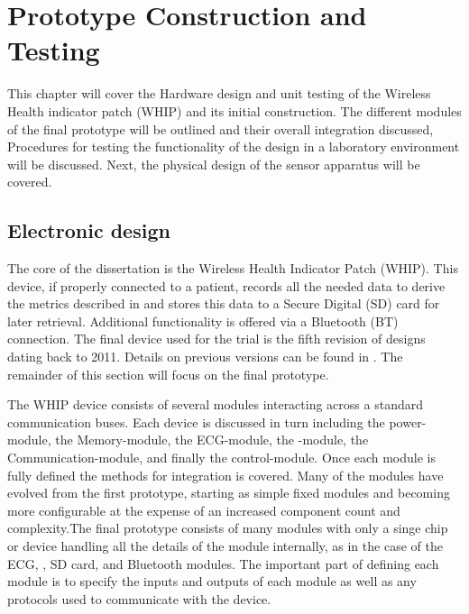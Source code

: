 \chapter{Prototype Construction and Testing}
\label{chap:ProtoTypeBuildTest}


This chapter will cover the Hardware design and unit testing of the Wireless Health indicator patch (WHIP) and its initial construction. The different modules of the final prototype will be outlined and their overall integration discussed, Procedures for testing the functionality of the design in a laboratory environment will be discussed. Next, the physical design of the sensor apparatus will be covered.

\section{Electronic design}


The core of the dissertation is the Wireless Health Indicator Patch (WHIP). This device, if properly connected to a patient, records all the needed data to derive the metrics described in  and stores this data to a Secure Digital (SD) card for later retrieval. Additional functionality is offered via a Bluetooth (BT) connection. The final device used for the trial is the fifth revision of designs dating back to 2011. Details on previous versions can be found in . The remainder of this section will focus on the final prototype.

The WHIP device consists of several modules interacting across a standard communication buses. Each device is discussed in turn including the power-module, the Memory-module, the ECG-module, the -module, the Communication-module, and finally the control-module. Once each module is fully defined the methods for integration is covered. Many of the modules have evolved from the first prototype, starting as simple fixed modules and becoming more configurable at the expense of an increased component count and complexity.The final prototype consists of many modules with only a singe chip or device handling all the details of the module internally, as in the case of the ECG, , SD card, and Bluetooth modules. The important part of defining each module is to specify the inputs and outputs of each module as well as any protocols used to communicate with the device.

